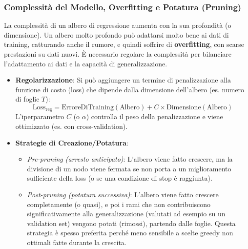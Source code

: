\documentclass{article}
\begin{document}
\subsubsection{Complessità del Modello, Overfitting e Potatura (Pruning)}
La complessità di un albero di regressione aumenta con la sua profondità (o dimensione). Un albero molto profondo può adattarsi molto bene ai dati di training, catturando anche il rumore, e quindi soffrire di \textbf{overfitting}, con scarse prestazioni su dati nuovi. È necessario regolare la complessità per bilanciare l'adattamento ai dati e la capacità di generalizzazione.
\begin{itemize}
    \item \textbf{Regolarizzazione}: Si può aggiungere un termine di penalizzazione alla funzione di costo (loss) che dipende dalla dimensione dell'albero (es. numero di foglie $T$):
          $$ \text{Loss}_{\text{reg}} = \text{ErroreDiTraining}(\text{Albero}) + C \times \text{Dimensione}(\text{Albero}) $$
          L'iperparametro $C$ (o $\alpha$) controlla il peso della penalizzazione e viene ottimizzato (es. con cross-validation).
    \item \textbf{Strategie di Creazione/Potatura}:
          \begin{itemize}
              \item \textit{Pre-pruning (arresto anticipato)}: L'albero viene fatto crescere, ma la divisione di un nodo viene fermata se non porta a un miglioramento sufficiente della loss (o se una condizione di stop è raggiunta).
              \item \textit{Post-pruning (potatura successiva)}: L'albero viene fatto crescere completamente (o quasi), e poi i rami che non contribuiscono significativamente alla generalizzazione (valutati ad esempio su un validation set) vengono potati (rimossi), partendo dalle foglie. Questa strategia è spesso preferita perché meno sensibile a scelte greedy non ottimali fatte durante la crescita.
          \end{itemize}
\end{itemize}
\end{document}
